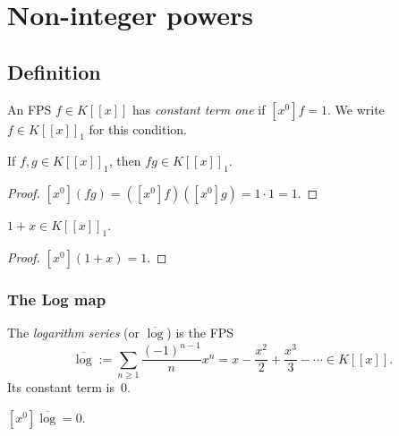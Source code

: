 \section{Non-integer powers}

\subsection{Definition}

\begin{definition}
\label{def.fps.HasConstantTermOne}
\leanhelper
\leanok
An FPS $f\in K[[x]]$ has \emph{constant term one} if $[x^0]f=1$.
We write $f\in K[[x]]_1$ for this condition.
\end{definition}

\begin{lemma}
\label{lem.fps.hasConstantTermOne-mul}
\leanhelper
\leanok
If $f,g\in K[[x]]_1$, then $fg\in K[[x]]_1$.
\end{lemma}

\begin{proof}
\leanok
$[x^0](fg) = ([x^0]f)([x^0]g) = 1\cdot 1 = 1$.
\end{proof}

\begin{lemma}
\label{lem.fps.hasConstantTermOne-one-add-X}
\leanhelper
\leanok
$1+x\in K[[x]]_1$.
\end{lemma}

\begin{proof}
\leanok
$[x^0](1+x) = 1$.
\end{proof}

\subsubsection{The Log map}

\begin{definition}
\label{def.fps.logSeries}
\leanhelper
\leanok
The \emph{logarithm series} (or $\overline{\log}$) is the FPS
\[
\overline{\log} := \sum_{n\geq 1} \frac{(-1)^{n-1}}{n} x^n
= x - \frac{x^2}{2} + \frac{x^3}{3} - \cdots
\in K[[x]].
\]
Its constant term is~$0$.
\end{definition}

\begin{lemma}
\label{lem.fps.constantCoeff-logSeries}
\leanhelper
\leanok
$[x^0]\overline{\log} = 0$.
\end{lemma}

